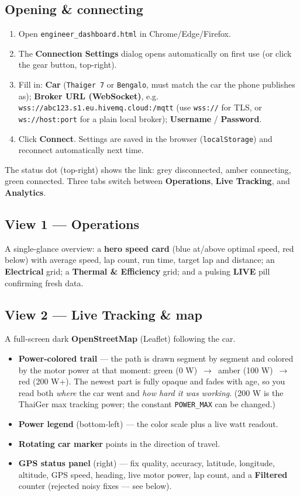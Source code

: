 \documentclass[11pt,a4paper,oneside]{report}
\newcommand{\arrow}{\,$\rightarrow$\,}
\newcommand{\code}[1]{\texttt{#1}}
\begin{document}
\subsection{Opening \& connecting}
\begin{enumerate}
  \item Open \code{engineer\_dashboard.html} in Chrome/Edge/Firefox.
  \item The \textbf{Connection Settings} dialog opens automatically on first use
    (or click the gear button, top-right).
  \item Fill in: \textbf{Car} (\code{Thaiger 7} or \code{Bengalo}, must match the
    car the phone publishes as); \textbf{Broker URL (WebSocket)}, e.g.
    \code{wss://abc123.s1.eu.hivemq.cloud:/mqtt} (use \code{wss://} for TLS, or
    \code{ws://host:port} for a plain local broker); \textbf{Username} /
    \textbf{Password}.
  \item Click \textbf{Connect}. Settings are saved in the browser
    (\code{localStorage}) and reconnect automatically next time.
\end{enumerate}
The status dot (top-right) shows the link: grey disconnected, amber connecting,
green connected. Three tabs switch between \textbf{Operations},
\textbf{Live Tracking}, and \textbf{Analytics}.

\subsection{View 1 --- Operations}
A single-glance overview: a \textbf{hero speed card} (blue at/above optimal speed,
red below) with average speed, lap count, run time, target lap and distance; an
\textbf{Electrical} grid; a \textbf{Thermal \& Efficiency} grid; and a pulsing
\textbf{LIVE} pill confirming fresh data.

\subsection{View 2 --- Live Tracking \& map}
A full-screen dark \textbf{OpenStreetMap} (Leaflet) following the car.
\begin{itemize}
  \item \textbf{Power-colored trail} --- the path is drawn segment by segment and
    colored by the motor power at that moment: \textcolor{tgreen}{green (0 W)}
    \arrow{} \textcolor{tamber}{amber (100 W)} \arrow{} \textcolor{tred}{red
    (200 W+)}. The newest part is fully opaque and fades with age, so you read both
    \emph{where} the car went and \emph{how hard it was working}. (200 W is the
    ThaiGer max tracking power; the constant \code{POWER\_MAX} can be changed.)
  \item \textbf{Power legend} (bottom-left) --- the color scale plus a live watt
    readout.
  \item \textbf{Rotating car marker} points in the direction of travel.
  \item \textbf{GPS status panel} (right) --- fix quality, accuracy, latitude,
    longitude, altitude, GPS speed, heading, live motor power, lap count, and a
    \textbf{Filtered} counter (rejected noisy fixes --- see below).
\end{itemize}
\end{document}
